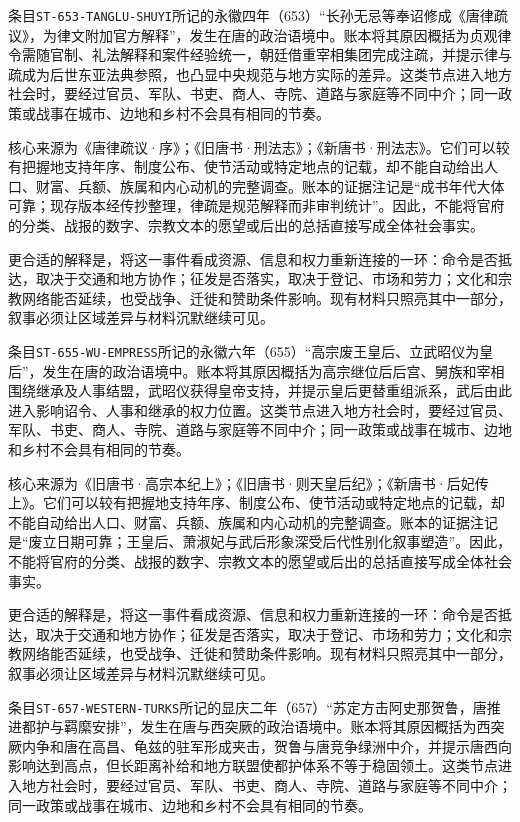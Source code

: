 条目\texttt{ST-653-TANGLU-SHUYI}所记的永徽四年（653）“长孙无忌等奉诏修成《唐律疏议》，为律文附加官方解释”，发生在唐的政治语境中。账本将其原因概括为贞观律令需随官制、礼法解释和案件经验统一，朝廷借重宰相集团完成注疏，并提示律与疏成为后世东亚法典参照，也凸显中央规范与地方实际的差异。这类节点进入地方社会时，要经过官员、军队、书吏、商人、寺院、道路与家庭等不同中介；同一政策或战事在城市、边地和乡村不会具有相同的节奏。

核心来源为《唐律疏议·序》；《旧唐书·刑法志》；《新唐书·刑法志》。它们可以较有把握地支持年序、制度公布、使节活动或特定地点的记载，却不能自动给出人口、财富、兵额、族属和内心动机的完整调查。账本的证据注记是“成书年代大体可靠；现存版本经传抄整理，律疏是规范解释而非审判统计”。因此，不能将官府的分类、战报的数字、宗教文本的愿望或后出的总括直接写成全体社会事实。

更合适的解释是，将这一事件看成资源、信息和权力重新连接的一环：命令是否抵达，取决于交通和地方协作；征发是否落实，取决于登记、市场和劳力；文化和宗教网络能否延续，也受战争、迁徙和赞助条件影响。现有材料只照亮其中一部分，叙事必须让区域差异与材料沉默继续可见。

条目\texttt{ST-655-WU-EMPRESS}所记的永徽六年（655）“高宗废王皇后、立武昭仪为皇后”，发生在唐的政治语境中。账本将其原因概括为高宗继位后后宫、舅族和宰相围绕继承及人事结盟，武昭仪获得皇帝支持，并提示皇后更替重组派系，武后由此进入影响诏令、人事和继承的权力位置。这类节点进入地方社会时，要经过官员、军队、书吏、商人、寺院、道路与家庭等不同中介；同一政策或战事在城市、边地和乡村不会具有相同的节奏。

核心来源为《旧唐书·高宗本纪上》；《旧唐书·则天皇后纪》；《新唐书·后妃传上》。它们可以较有把握地支持年序、制度公布、使节活动或特定地点的记载，却不能自动给出人口、财富、兵额、族属和内心动机的完整调查。账本的证据注记是“废立日期可靠；王皇后、萧淑妃与武后形象深受后代性别化叙事塑造”。因此，不能将官府的分类、战报的数字、宗教文本的愿望或后出的总括直接写成全体社会事实。

更合适的解释是，将这一事件看成资源、信息和权力重新连接的一环：命令是否抵达，取决于交通和地方协作；征发是否落实，取决于登记、市场和劳力；文化和宗教网络能否延续，也受战争、迁徙和赞助条件影响。现有材料只照亮其中一部分，叙事必须让区域差异与材料沉默继续可见。

条目\texttt{ST-657-WESTERN-TURKS}所记的显庆二年（657）“苏定方击阿史那贺鲁，唐推进都护与羁縻安排”，发生在唐与西突厥的政治语境中。账本将其原因概括为西突厥内争和唐在高昌、龟兹的驻军形成夹击，贺鲁与唐竞争绿洲中介，并提示唐西向影响达到高点，但长距离补给和地方联盟使都护体系不等于稳固领土。这类节点进入地方社会时，要经过官员、军队、书吏、商人、寺院、道路与家庭等不同中介；同一政策或战事在城市、边地和乡村不会具有相同的节奏。

